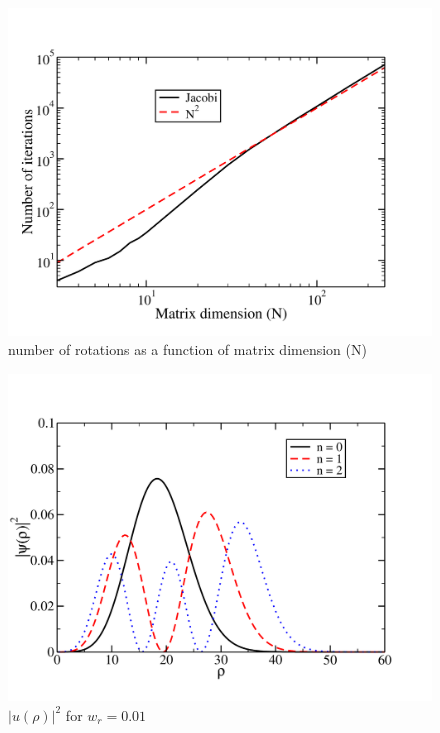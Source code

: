 \documentclass[prc,amsmath,twocolumn,superscriptaddress]{revtex4}
\begin{document}
\begin{figure}[t]
\includegraphics[scale=0.33]{N_trans.pdf}
\caption{number of rotations as a function of matrix dimension (N)}
\label{algorithm}
\end{figure}

\begin{figure}[t]
\includegraphics[scale=0.33]{wf_01.pdf}
\caption{$|u(\rho)|^2$ for $w_r = 0.01$}
\label{algorithm}
\end{figure}
\end{document}
